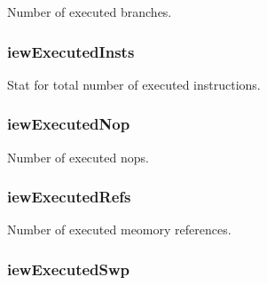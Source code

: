 \label{classDefaultIEW_a69db59d35af8f8904b1e176cb611fc9b}
Number of executed branches. \hypertarget{classDefaultIEW_a96ac594d4d0ac05306c6c3679ffbbfaa}{
\subsubsection[{iewExecutedInsts}]{ {\bf iewExecutedInsts}}}
\label{classDefaultIEW_a96ac594d4d0ac05306c6c3679ffbbfaa}
Stat for total number of executed instructions. \hypertarget{classDefaultIEW_a63390d8471177b1fbca3c4352cce1e8f}{
\subsubsection[{iewExecutedNop}]{ {\bf iewExecutedNop}}}
\label{classDefaultIEW_a63390d8471177b1fbca3c4352cce1e8f}
Number of executed nops. \hypertarget{classDefaultIEW_a7fdb9d8f885ec0c7d7db3015b254c073}{
\subsubsection[{iewExecutedRefs}]{ {\bf iewExecutedRefs}}}
\label{classDefaultIEW_a7fdb9d8f885ec0c7d7db3015b254c073}
Number of executed meomory references. \hypertarget{classDefaultIEW_ab4a8c8cadda04122d21fc9596057b8ce}{
\subsubsection[{iewExecutedSwp}]{ {\bf iewExecutedSwp}}}
